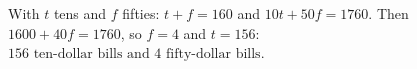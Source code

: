 With $t$ tens and $f$ fifties: $t+f=160$ and $10t+50f=1760$. Then $1600+40f=1760$, so $f=4$ and $t=156$: $\boxed{156\text{ ten-dollar bills and }4\text{ fifty-dollar bills}}$.
